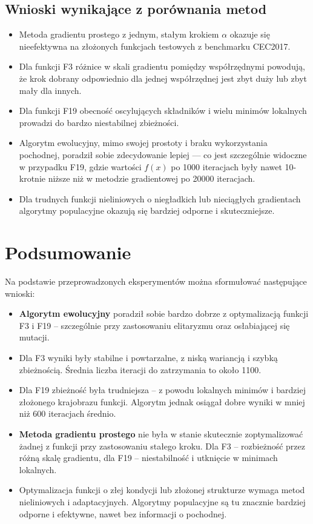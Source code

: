 \documentclass[a4paper]{article}
\begin{document}
\subsection{Wnioski wynikające z porównania metod}

\begin{itemize}
  \item Metoda gradientu prostego z jednym, stałym krokiem \(\alpha\) okazuje się nieefektywna na złożonych funkcjach testowych z benchmarku CEC2017.
  \item Dla funkcji F3 różnice w skali gradientu pomiędzy współrzędnymi powodują, że krok dobrany odpowiednio dla jednej współrzędnej jest zbyt duży lub zbyt mały dla innych.
  \item Dla funkcji F19 obecność oscylujących składników i wielu minimów lokalnych prowadzi do bardzo niestabilnej zbieżności.
  \item Algorytm ewolucyjny, mimo swojej prostoty i braku wykorzystania pochodnej, poradził sobie zdecydowanie lepiej — co jest szczególnie widoczne w przypadku F19, gdzie wartości \(f(x)\) po 1000 iteracjach były nawet 10-krotnie niższe niż w metodzie gradientowej po 20000 iteracjach.
  \item Dla trudnych funkcji nieliniowych o niegładkich lub nieciągłych gradientach algorytmy populacyjne okazują się bardziej odporne i skuteczniejsze.
\end{itemize}

\section{Podsumowanie}
Na podstawie przeprowadzonych eksperymentów można sformułować następujące wnioski:

\begin{itemize}
  \item \textbf{Algorytm ewolucyjny} poradził sobie bardzo dobrze z optymalizacją funkcji F3 i F19 – szczególnie przy zastosowaniu elitaryzmu oraz osłabiającej się mutacji.
  \item Dla F3 wyniki były stabilne i powtarzalne, z niską wariancją i szybką zbieżnością.  
        Średnia liczba iteracji do zatrzymania to około 1100.
  \item Dla F19 zbieżność była trudniejsza – z powodu lokalnych minimów i bardziej złożonego krajobrazu funkcji.  
        Algorytm jednak osiągał dobre wyniki w mniej niż 600 iteracjach średnio.
  \item \textbf{Metoda gradientu prostego} nie była w stanie skutecznie zoptymalizować żadnej z funkcji przy zastosowaniu stałego kroku.  
        Dla F3 – rozbieżność przez różną skalę gradientu, dla F19 – niestabilność i utknięcie w minimach lokalnych.
  \item Optymalizacja funkcji o złej kondycji lub złożonej strukturze wymaga metod nieliniowych i adaptacyjnych.  
        Algorytmy populacyjne są tu znacznie bardziej odporne i efektywne, nawet bez informacji o pochodnej.
\end{itemize}
\end{document}
